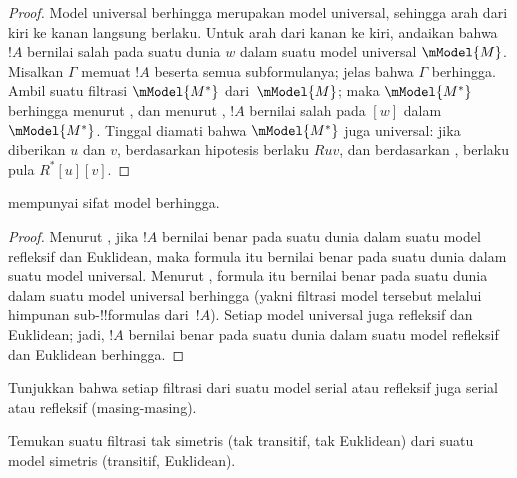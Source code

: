 \documentclass[../../../include/open-logic-section]{subfiles}
\begin{document}
\begin{proof}
  Model universal berhingga merupakan model universal, sehingga arah dari
  kiri ke kanan langsung berlaku. Untuk arah dari kanan ke kiri, andaikan
  bahwa~$!A$ bernilai salah pada suatu dunia $w$ dalam suatu model universal
  $\mModel{M}$. Misalkan $\Gamma$ memuat $!A$ beserta semua subformulanya;
  jelas bahwa $\Gamma$ berhingga. Ambil suatu filtrasi $\mModel{M^*}$
  dari~$\mModel{M}$; maka $\mModel{M^*}$ berhingga menurut
  , dan menurut
  , $!A$ bernilai salah pada $[w]$
  dalam~$\mModel{M^*}$. Tinggal diamati bahwa $\mModel{M^*}$ juga universal:
  jika diberikan $u$ dan $v$, berdasarkan hipotesis berlaku $Ruv$, dan
  berdasarkan ,
  berlaku pula $R^*[u][v]$.
\end{proof}

\begin{cor}
   mempunyai sifat model berhingga.
\end{cor}

\begin{proof}
  Menurut , jika $!A$ bernilai benar pada suatu
  dunia dalam suatu model refleksif dan Euklidean, maka formula itu bernilai
  benar pada suatu dunia dalam suatu model universal. Menurut
  , formula itu bernilai benar pada suatu dunia dalam
  suatu model universal berhingga (yakni filtrasi model tersebut melalui
  himpunan sub-!!{formula}s dari~$!A$). Setiap model universal juga refleksif
  dan Euklidean; jadi, $!A$ bernilai benar pada suatu dunia dalam suatu model
  refleksif dan Euklidean berhingga.
\end{proof}

\begin{prob}
  Tunjukkan bahwa setiap filtrasi dari suatu model serial atau refleksif juga
  serial atau refleksif (masing-masing).
\end{prob}

\begin{prob}
  Temukan suatu filtrasi tak simetris (tak transitif, tak Euklidean) dari suatu
  model simetris (transitif, Euklidean).
\end{prob}
\end{document}
